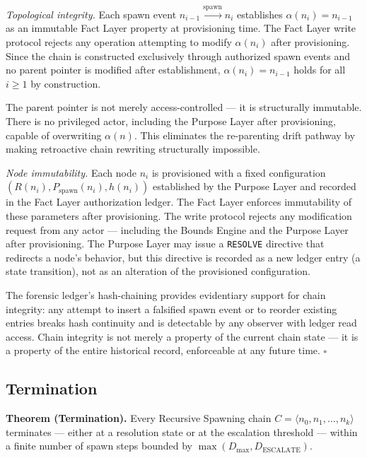 \medskip
\textit{Topological integrity.} Each spawn event $n_{i-1} \xrightarrow{\mathrm{spawn}} n_i$ establishes $\alpha(n_i) = n_{i-1}$ as an immutable Fact Layer property at provisioning time. The Fact Layer write protocol rejects any operation attempting to modify $\alpha(n_i)$ after provisioning. Since the chain is constructed exclusively through authorized spawn events and no parent pointer is modified after establishment, $\alpha(n_i) = n_{i-1}$ holds for all $i \geq 1$ by construction.

The parent pointer is not merely access-controlled --- it is structurally immutable. There is no privileged actor, including the Purpose Layer after provisioning, capable of overwriting $\alpha(n)$. This eliminates the re-parenting drift pathway by making retroactive chain rewriting structurally impossible.

\medskip
\textit{Node immutability.} Each node $n_i$ is provisioned with a fixed configuration $(R(n_i), P_{\mathrm{spawn}}(n_i), h(n_i))$ established by the Purpose Layer and recorded in the Fact Layer authorization ledger. The Fact Layer enforces immutability of these parameters after provisioning. The write protocol rejects any modification request from any actor --- including the Bounds Engine and the Purpose Layer after provisioning. The Purpose Layer may issue a \texttt{RESOLVE} directive that redirects a node's behavior, but this directive is recorded as a new ledger entry (a state transition), not as an alteration of the provisioned configuration.

The forensic ledger's hash-chaining provides evidentiary support for chain integrity: any attempt to insert a falsified spawn event or to reorder existing entries breaks hash continuity and is detectable by any observer with ledger read access. Chain integrity is not merely a property of the current chain state --- it is a property of the entire historical record, enforceable at any future time. $\square$

\subsection{Termination}
\label{sec:rs-termination}

\medskip
\noindent\textbf{Theorem (Termination).} Every Recursive Spawning chain $C = \langle n_0, n_1, \ldots, n_k \rangle$ terminates --- either at a resolution state or at the escalation threshold --- within a finite number of spawn steps bounded by $\max(D_{\mathrm{max}}, D_{\mathrm{ESCALATE}})$.

